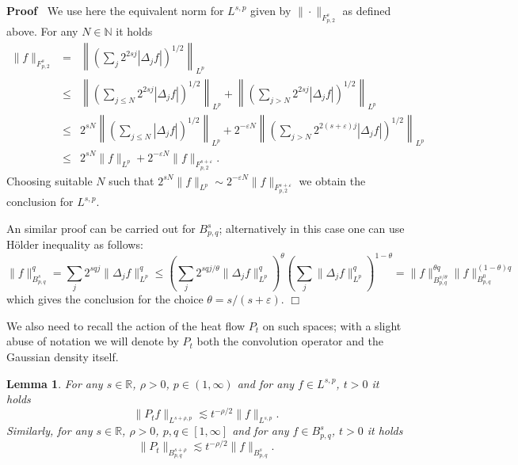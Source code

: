 \documentclass[10pt]{article}
\newenvironment{proof}{\noindent\textbf{Proof\ }}{\hspace*{\fill}$\Box$\medskip}
\newtheorem{lemma}{Lemma}
\begin{document}
\begin{proof}
  We use here the equivalent norm for $L^{s, p}$ given by $\| \cdot
  \|_{F^s_{p, 2}}$ as defined above. For any $N \in \mathbb{N}$ it holds
  \begin{eqnarray*}
    \| f \|_{F^s_{p, 2}} & = & \left\| \left( \sum_j 2^{2 s j} | \Delta_j f |
    \right)^{1 / 2} \right\|_{L^p}\\
    & \leqslant & \left\| \left( \sum_{j \leqslant N} 2^{2 s j} | \Delta_j f
    | \right)^{1 / 2} \right\|_{L^p} + \left\| \left( \sum_{j > N} 2^{2 s j} |
    \Delta_j f | \right)^{1 / 2} \right\|_{L^p}\\
    & \leqslant & 2^{s N} \left\| \left( \sum_{j \leqslant N} | \Delta_j f |
    \right)^{1 / 2} \right\|_{L^p} + 2^{- \varepsilon N} \left\| \left(
    \sum_{j > N} 2^{2 (s + \varepsilon) j} | \Delta_j f | \right)^{1 / 2}
    \right\|_{L^p}\\
    & \leqslant & 2^{s N} \| f \|_{L^p} + 2^{- \varepsilon N} \| f \|_{F^{s +
    \varepsilon}_{p, 2}} .
  \end{eqnarray*}
  Choosing suitable $N$ such that $2^{s N} \| f \|_{L^p} \sim 2^{- \varepsilon
  N} \| f \|_{F^{s + \varepsilon}_{p, 2}}$ we obtain the conclusion for $L^{s,
  p}$.
  
  An similar proof can be carried out for $B^s_{p, q}$; alternatively in this
  case one can use H{\"o}lder inequality as follows:
  \[ \| f \|^q_{B^s_{p, q}} = \sum_j 2^{s q j} \| \Delta_j f \|^q_{L^p}
     \leqslant \left( \sum_j 2^{s q j / \theta} \| \Delta_j f \|^q_{L^p}
     \right)^{\theta} \left( \sum_j \| \Delta_j f \|^q_{L^p} \right)^{1 -
     \theta} = \| f \|^{\theta q}_{B^{s / \theta}_{p, q}} \| f \|_{B^0_{p,
     q}}^{(1 - \theta) q} \]
  which gives the conclusion for the choice $\theta = s / (s + \varepsilon)$.
\end{proof}

We also need to recall the action of the heat flow $P_t$ on such spaces; with
a slight abuse of notation we will denote by $P_t$ both the convolution
operator and the Gaussian density itself.

\begin{lemma}
  \label{appendixA2 heat kernel estimates}For any $s \in \mathbb{R}$, $\rho >
  0$, $p \in (1, \infty)$ and for any $f \in L^{s, p}$, $t > 0$ it holds
  \begin{equation}
    \| P_t f \|_{L^{s + \rho, p}} \lesssim t^{- \rho / 2} \| f \|_{L^{s, p}} .
  \end{equation}
  Similarly, for any $s \in \mathbb{R}$, $\rho > 0$, $p, q \in [1, \infty]$
  and for any $f \in B^s_{p, q}$, $t > 0$ it holds
  \begin{equation}
    \| P_t \|_{B^{s + \rho}_{p, q}} \lesssim t^{- \rho / 2} \| f \|_{B^s_{p,
    q}} .
  \end{equation}
\end{lemma}
\end{document}
